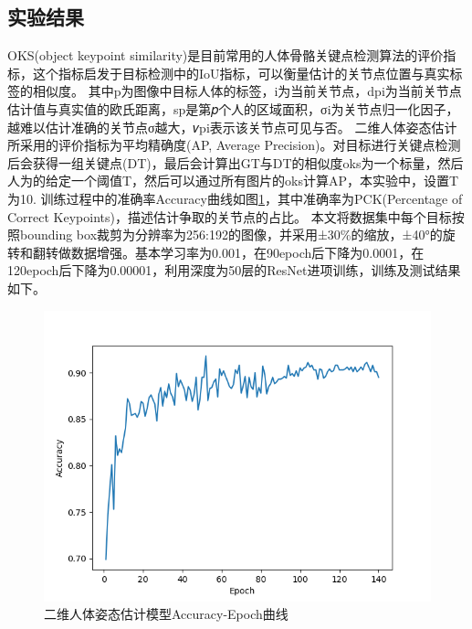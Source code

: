 \subsection{实验结果}{}
OKS(object keypoint similarity)是目前常用的人体骨骼关键点检测算法的评价指标，这个指标启发于目标检测中的IoU指标，可以衡量估计的关节点位置与真实标签的相似度。
其中p为图像中目标人体的标签，i为当前关节点，dpi为当前关节点估计值与真实值的欧氏距离，sp是第𝑝个人的区域面积，σi为关节点归一化因子，越难以估计准确的关节点σ越大，𝑣pi表示该关节点可见与否。
二维人体姿态估计所采用的评价指标为平均精确度(AP, Average Precision)。对目标进行关键点检测后会获得一组关键点(DT)，最后会计算出GT与DT的相似度oks为一个标量，然后人为的给定一个阈值T，然后可以通过所有图片的oks计算AP，本实验中，设置T为10.
训练过程中的准确率Accuracy曲线如图\ref{fig:f20}，其中准确率为PCK(Percentage of Correct Keypoints)，描述估计争取的关节点的占比。
本文将数据集中每个目标按照bounding box裁剪为分辨率为256:192的图像，并采用±30\%的缩放，±40°的旋转和翻转做数据增强。基本学习率为0.001，在90epoch后下降为0.0001，在120epoch后下降为0.00001，利用深度为50层的ResNet进项训练，训练及测试结果如下。
\begin{figure}[h]
	\centering
	\includegraphics[scale=0.4]{figures/20.png}
	\caption{二维人体姿态估计模型Accuracy-Epoch曲线}
	\label{fig:f20}
\end{figure}
